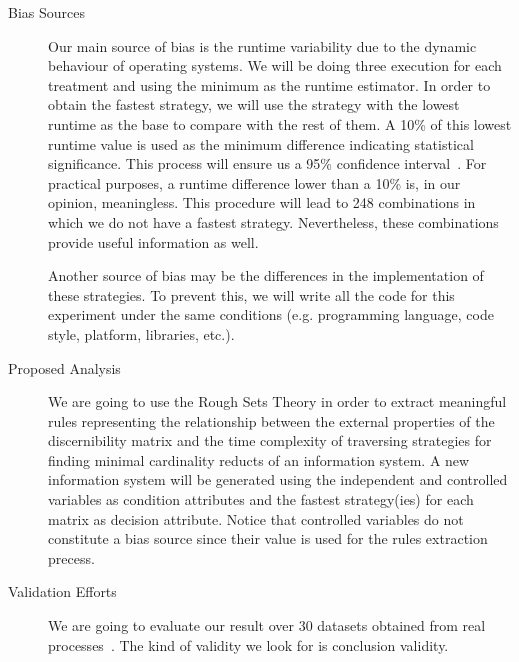 \documentclass[11pt]{article}   %
\begin{document}
  \begin{description}
    \item[Bias Sources] Our main source of bias is the runtime variability due to the dynamic behaviour of
    					   	operating systems. We will be doing three execution for each treatment and using 
    					   	the minimum as the runtime estimator. In order to obtain the fastest strategy, we 
    					   	will use the strategy with the lowest runtime as the base to compare with the rest of 
    					   	them. A 10\% of this lowest runtime value is used as the minimum difference indicating
    					   	statistical significance. This process will ensure us a 95\% confidence
    					   	interval~\cite{Haveraaen01}.
    					   	For practical purposes, a runtime difference lower than a 10\% is, in our opinion, 
    					   	meaningless. This procedure will lead to 248 combinations in which we do not have a
    					   	fastest strategy. Nevertheless, these combinations provide useful information as well.
    					   	
    					   	Another source of bias may be the differences in the implementation of these strategies.
    					   	To prevent this, we will write all the code for this experiment under the same conditions
    					   	(e.g. programming language, code style, platform, libraries, etc.).  					   	
    	\item[Proposed Analysis] We are going to use the Rough Sets Theory in order to extract meaningful rules 
    							 representing the relationship between the external properties of the discernibility 
  							 matrix and the time complexity of traversing strategies for finding minimal
  							 cardinality reducts of an information system. A new information system will be
  							 generated using the independent and controlled variables as condition attributes and
  							 the fastest strategy(ies) for each matrix as decision attribute. 
  							 Notice that controlled variables do not constitute a bias source since their value
  							 is used for the rules extraction precess.
    	\item[Validation Efforts] We are going to evaluate our result over 30 datasets obtained from real 
    							  processes~\cite{Bache13}. The kind of validity we look for is conclusion validity. 
  \end{description}
\end{document}
